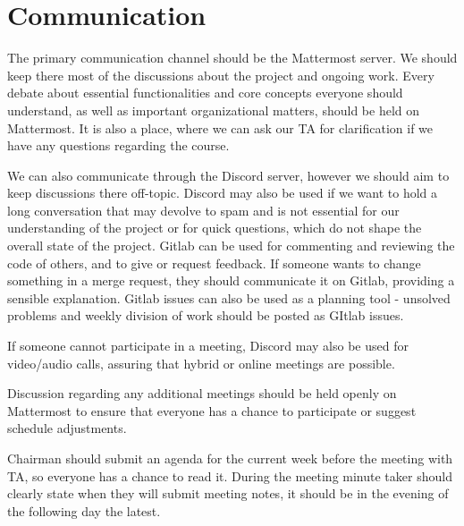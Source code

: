 \section{Communication}

The primary communication channel should be the Mattermost server. We should keep there most of the discussions about the project and ongoing work. Every debate about essential functionalities and core concepts everyone should understand, as well as important organizational matters, should be held on Mattermost. It is also a place, where we can ask our TA for clarification if we have any questions regarding the course.

We can also communicate through the Discord server, however we should aim to keep discussions there off-topic. Discord may also be used if we want to hold a long conversation that may devolve to spam and is not essential for our understanding of the project or for quick questions, which do not shape the overall state of the project. Gitlab can be used for commenting and reviewing the code of others, and to give or request feedback. If someone wants to change something in a merge request, they should communicate it on Gitlab, providing a sensible explanation. Gitlab issues can also be used as a planning tool - unsolved problems and weekly division of work should be posted as GItlab issues.

If someone cannot participate in a meeting, Discord may also be used for video/audio calls, assuring that hybrid or online meetings are possible.

Discussion regarding any additional meetings should be held openly on Mattermost to ensure that everyone has a chance to participate or suggest schedule adjustments.

Chairman should submit an agenda for the current week before the meeting with TA, so everyone has a chance to read it. During the meeting minute taker should clearly state when they will submit meeting notes, it should be in the evening of the following day the latest.
